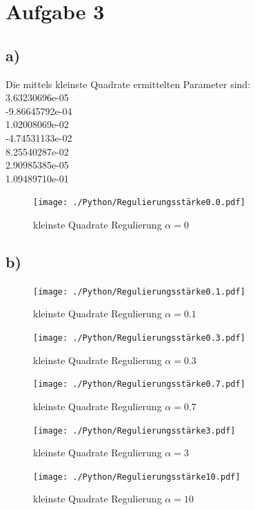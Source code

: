 \section*{Aufgabe 3}
\subsection*{a)}

Die mittels kleinste Quadrate ermittelten Parameter sind:\\
3.63230696e-05	\\
-9.86645792e-04	\\
1.02008069e-02	\\
-4.74531133e-02	\\
8.25540287e-02	\\
2.90985385e-05	\\
1.09489710e-01	\\


\begin{figure}[H]
  \centering
  \texttt{[image: ./Python/Regulierungsstärke0.0.pdf]}
  \caption{kleinste Quadrate Regulierung $\alpha = 0$}
\end{figure}

\subsection*{b)}
\begin{figure}[H]
  \centering
  \texttt{[image: ./Python/Regulierungsstärke0.1.pdf]}
  \caption{kleinste Quadrate Regulierung $\alpha = 0.1$}
\end{figure}

\begin{figure}
  \centering
  \texttt{[image: ./Python/Regulierungsstärke0.3.pdf]}
  \caption{kleinste Quadrate Regulierung $\alpha = 0.3$}
\end{figure}

\begin{figure}
  \centering
  \texttt{[image: ./Python/Regulierungsstärke0.7.pdf]}
  \caption{kleinste Quadrate Regulierung $\alpha = 0.7$}
\end{figure}

\begin{figure}
  \centering
  \texttt{[image: ./Python/Regulierungsstärke3.pdf]}
  \caption{kleinste Quadrate Regulierung $\alpha = 3$}
\end{figure}

\begin{figure}
  \centering
  \texttt{[image: ./Python/Regulierungsstärke10.pdf]}
  \caption{kleinste Quadrate Regulierung $\alpha = 10$}
\end{figure}

